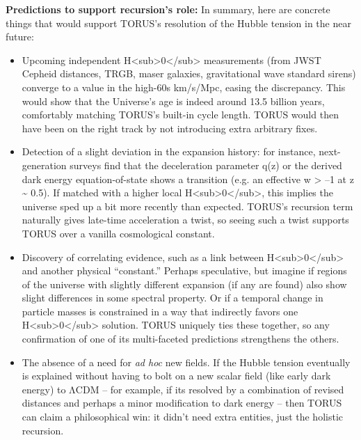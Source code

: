 \documentclass[
]{article}
\begin{document}
\textbf{Predictions to support recursion's role:} In summary, here are
concrete things that would support TORUS's resolution of the Hubble
tension in the near future:

\begin{itemize}
\item
  Upcoming independent
  H\textless sub\textgreater0\textless/sub\textgreater{} measurements
  (from JWST Cepheid distances, TRGB, maser galaxies, gravitational wave
  standard sirens) converge to a value in the high-60s km/s/Mpc, easing
  the discrepancy. This would show that the Universe's age is indeed
  around 13.5 billion years, comfortably matching TORUS's built-in cycle
  length. TORUS would then have been on the right track by not
  introducing extra arbitrary fixes.
\item
  Detection of a slight deviation in the expansion history: for
  instance, next-generation surveys find that the deceleration parameter
  q(z) or the derived dark energy equation-of-state shows a transition
  (e.g. an effective w \textgreater{} --1 at z \textasciitilde{} 0.5).
  If matched with a higher local
  H\textless sub\textgreater0\textless/sub\textgreater, this implies the
  universe sped up a bit more recently than expected. TORUS's recursion
  term naturally gives late-time acceleration a twist, so seeing such a
  twist supports TORUS over a vanilla cosmological constant.
\item
  Discovery of correlating evidence, such as a link between
  H\textless sub\textgreater0\textless/sub\textgreater{} and another
  physical ``constant.'' Perhaps speculative, but imagine if regions of
  the universe with slightly different expansion (if any are found) also
  show slight differences in some spectral property. Or if a temporal
  change in particle masses is constrained in a way that indirectly
  favors one H\textless sub\textgreater0\textless/sub\textgreater{}
  solution. TORUS uniquely ties these together, so any confirmation of
  one of its multi-faceted predictions strengthens the others.
\item
  The absence of a need for \emph{ad hoc} new fields. If the Hubble
  tension eventually is explained without having to bolt on a new scalar
  field (like early dark energy) to ΛCDM -- for example, if
  it\textquotesingle s resolved by a combination of revised distances
  and perhaps a minor modification to dark energy -- then TORUS can
  claim a philosophical win: it didn't need extra entities, just the
  holistic recursion.
\end{itemize}
\end{document}
